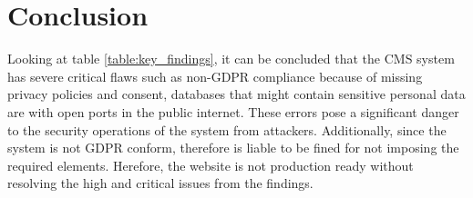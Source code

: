 \newpage
\section{Conclusion}
Looking at table \ref{table:key_findings}, it can be concluded that the CMS system has severe critical flaws such as non-GDPR compliance because of missing privacy policies and consent, databases that might contain sensitive personal data are with open ports in the public internet. These errors pose a significant danger to the security operations of the system from attackers. Additionally, since the system is not GDPR conform, therefore is liable to be fined for not imposing the required elements. Herefore, the website is not production ready without resolving the high and critical issues from the findings.
